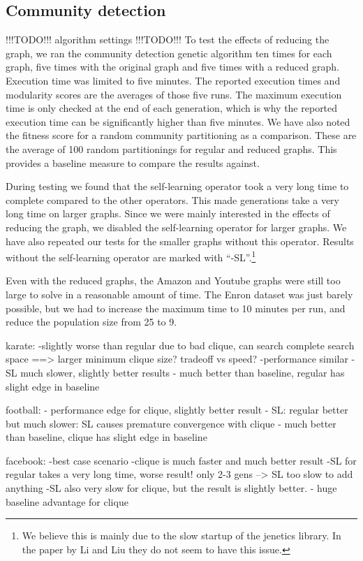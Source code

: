 \subsection{Community detection}
!!!TODO!!! algorithm settings !!!TODO!!!
To test the effects of reducing the graph, we ran the community detection genetic algorithm ten times for each graph, five times with the original graph and five times with a reduced graph. Execution time was limited to five minutes. The reported execution times and modularity scores are the averages of those five runs. The maximum execution time is only checked at the end of each generation, which is why the reported execution time can be significantly higher than five minutes. We have also noted the fitness score for a random community partitioning as a comparison. These are the average of 100  random partitionings for regular and reduced graphs. This provides a baseline measure to compare the results against.
\par
During testing we found that the self-learning operator took a very long time to complete compared to the other operators. This made generations take a very long time on larger graphs. Since we were mainly interested in the effects of reducing the graph, we disabled the self-learning operator for larger graphs. We have also repeated our tests for the smaller graphs without this operator. Results without the self-learning operator are marked with ``-SL''.\footnote{We believe this is mainly due to the slow startup of the jenetics library. In the paper by Li and Liu they do not seem to have this issue. }
\par
Even with the reduced graphs, the Amazon and Youtube graphs were still too large to solve in a reasonable amount of time. The Enron dataset was just barely possible, but we had to increase the maximum time to 10 minutes per run, and reduce the population size from 25 to 9.




karate: 
-slightly worse than regular due to bad clique, can search complete search space ==> larger minimum clique size? tradeoff vs speed?
-performance similar
-SL much slower, slightly better results
- much better than baseline, regular has slight edge in baseline

football:
- performance edge for clique, slightly better result
- SL: regular better but much slower: SL causes premature convergence with clique
- much better than baseline, clique has slight edge in baseline

facebook:
-best case scenario
-clique is much faster and much better result
-SL for regular takes a very long time, worse result! only 2-3 gens --> SL too slow to add anything
-SL also very slow for clique, but the result is slightly better.
- huge baseline advantage for clique

